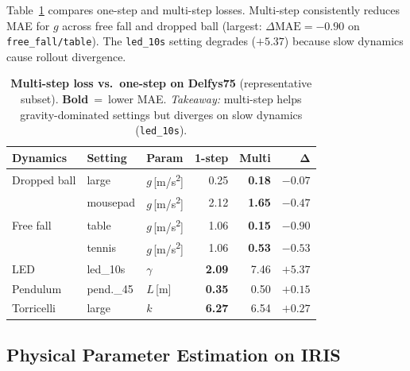 \documentclass[runningheads]{llncs}
\begin{document}
Table~\ref{tab:multistep_ablation} compares one-step and multi-step losses. Multi-step consistently reduces MAE for $g$ across free fall and dropped ball (largest: $\Delta\mathrm{MAE} = -0.90$ on \texttt{free\_fall/table}). The \texttt{led\_10s} setting degrades ($+5.37$) because slow dynamics cause rollout divergence.

\begin{table}[t]
  \centering
  \caption{\textbf{Multi-step loss vs.\ one-step on Delfys75} (representative subset). \colorbox{bestcolor}{\textbf{Bold}}~=~lower MAE. \emph{Takeaway:} multi-step helps gravity-dominated settings but diverges on slow dynamics (\texttt{led\_10s}).}
  \label{tab:multistep_ablation}
  \scriptsize
  \setlength{\tabcolsep}{3pt}
  \renewcommand{\arraystretch}{1.05}
  \begin{tabular}{@{}lllrrr@{}}
    \toprule
    \textbf{Dynamics} & \textbf{Setting} & \textbf{Param} &
    \textbf{1-step} & \textbf{Multi} & $\bm{\Delta}$ \\
    \midrule
    Dropped ball & large & $g$\,[m/s\textsuperscript{2}] & 0.25 & \cellcolor{bestcolor}\textbf{0.18} & $-0.07$ \\
    \multirow{3}{*}{Free fall}
        & mousepad & $g$\,[m/s\textsuperscript{2}] & 2.12 & \cellcolor{bestcolor}\textbf{1.65} & $-0.47$ \\
        & table & $g$\,[m/s\textsuperscript{2}] & 1.06 & \cellcolor{bestcolor}\textbf{0.15} & $-0.90$ \\
        & tennis & $g$\,[m/s\textsuperscript{2}] & 1.06 & \cellcolor{bestcolor}\textbf{0.53} & $-0.53$ \\
    LED & led\_10s & $\gamma$ & \cellcolor{bestcolor}\textbf{2.09} & 7.46 & $+5.37$ \\
    Pendulum & pend.\_45 & $L$\,[m] & \cellcolor{bestcolor}\textbf{0.35} & 0.50 & $+0.15$ \\
    Torricelli & large & $k$ & \cellcolor{bestcolor}\textbf{6.27} & 6.54 & $+0.27$ \\
    \bottomrule
  \end{tabular}
\end{table}

\subsection{Physical Parameter Estimation on IRIS}
\label{sec:exp_iris}
\end{document}
